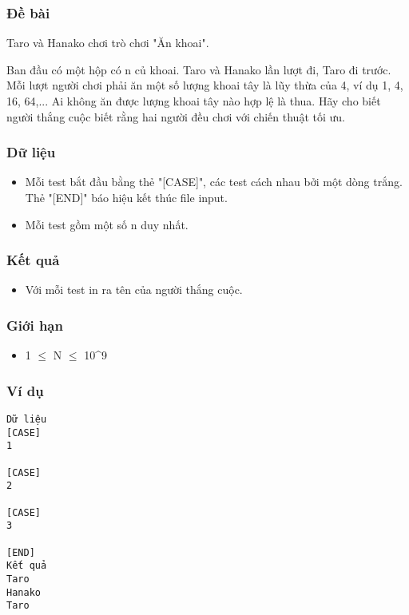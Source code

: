 



\subsubsection{   Đề bài  }

   Taro và Hanako chơi trò chơi "Ăn khoai".  

   Ban đầu có một hộp có n củ khoai. Taro và Hanako lần lượt đi, Taro đi trước. Mỗi lượt người chơi phải ăn một số lượng khoai tây là lũy thừa của 4, ví dụ 1, 4, 16, 64,... Ai không ăn được lượng khoai tây nào hợp lệ là thua. Hãy cho biết người thắng cuộc biết rằng hai người đều chơi với chiến thuật tối ưu.  

\subsubsection{   Dữ liệu  }
\begin{itemize}
	\item     Mỗi test bắt đầu bằng thẻ "[CASE]", các test cách nhau bởi một dòng trắng. Thẻ "[END]" báo hiệu kết thúc file input.   
	\item     Mỗi test gồm một số n duy nhất.   
\end{itemize}

\subsubsection{   Kết quả  }
\begin{itemize}
	\item     Với mỗi test in ra tên của người thắng cuộc.   
\end{itemize}

\subsubsection{   Giới hạn  }
\begin{itemize}
	\item     1  $\le$  N  $\le$  10\textasciicircum9   
\end{itemize}

\subsubsection{   Ví dụ  }
\begin{verbatim}
Dữ liệu
[CASE]
1

[CASE]
2

[CASE]
3

[END]
Kết quả
Taro
Hanako
Taro
\end{verbatim}
